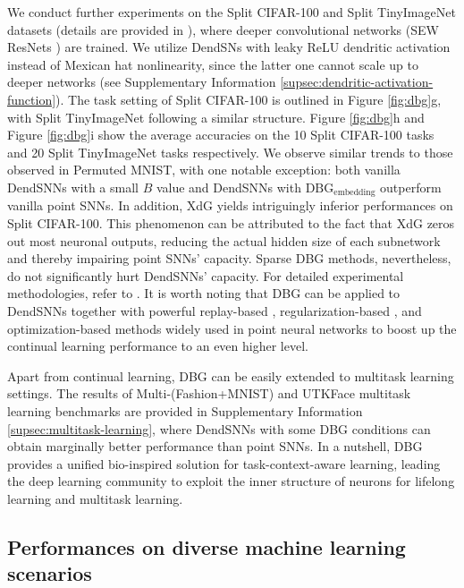 We conduct further experiments on the Split CIFAR-100 \cite{zenke2017continual} and Split TinyImageNet datasets (details are provided in ), where deeper convolutional networks (SEW ResNets \cite{fang2021sew}) are trained. We utilize DendSNs with leaky ReLU dendritic activation instead of Mexican hat nonlinearity, since the latter one cannot scale up to deeper networks (see Supplementary Information \ref{supsec:dendritic-activation-function}). The task setting of Split CIFAR-100 is outlined in Figure \ref{fig:dbg}g, with Split TinyImageNet following a similar structure. Figure \ref{fig:dbg}h and Figure \ref{fig:dbg}i show the average accuracies on the 10 Split CIFAR-100 tasks and 20 Split TinyImageNet tasks respectively. We observe similar trends to those observed in Permuted MNIST, with one notable exception: both vanilla DendSNNs with a small $B$ value and DendSNNs with $\mathrm{DBG}_{\mathrm{embedding}}$ outperform vanilla point SNNs. In addition, XdG yields intriguingly inferior performances on Split CIFAR-100. This phenomenon can be attributed to the fact that XdG zeros out most neuronal outputs, reducing the actual hidden size of each subnetwork and thereby impairing point SNNs' capacity. Sparse DBG methods, nevertheless, do not significantly hurt DendSNNs' capacity. For detailed experimental methodologies, refer to . It is worth noting that DBG can be applied to DendSNNs together with powerful replay-based \cite{shin2017replay}, regularization-based \cite{kirkpatrick2017overcoming,zenke2017continual}, and optimization-based \cite{farajtabar2020orthogonal} methods widely used in point neural networks to boost up the continual learning performance to an even higher level.

Apart from continual learning, DBG can be easily extended to multitask learning settings. The results of Multi-(Fashion+MNIST) \cite{lin2019pareto} and UTKFace \cite{zhang2017utkface} multitask learning benchmarks are provided in Supplementary Information \ref{supsec:multitask-learning}, where DendSNNs with some DBG conditions can obtain marginally better performance than point SNNs. In a nutshell, DBG provides a unified bio-inspired solution for task-context-aware learning, leading the deep learning community to exploit the inner structure of neurons for lifelong learning and multitask learning.

\subsection*{Performances on diverse machine learning scenarios}

